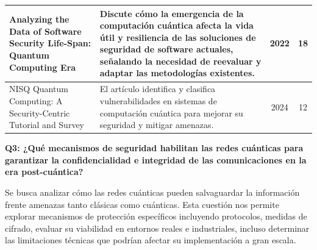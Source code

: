 \begin{longtable}{@{} p{4.5cm} p{6.5cm} c c @{}}
\hline
Analyzing the Data of Software Security Life-Span: Quantum Computing Era~\cite{Alyami2022} & Discute cómo la emergencia de la computación cuántica afecta la vida útil y resiliencia de las soluciones de seguridad de software actuales, señalando la necesidad de reevaluar y adaptar las metodologías existentes. & 2022 & 18 \\
\hline
NISQ Quantum Computing: A Security-Centric Tutorial and Survey~\cite{Chen2024} & El artículo identifica y clasifica vulnerabilidades en sistemas de computación cuántica para mejorar su seguridad y mitigar amenazas. & 2024 & 12 \\
\end{longtable}

\vspace{1em} \textbf {Q3: ¿Qué mecanismos de seguridad habilitan las redes cuánticas para garantizar la confidencialidad e integridad de las comunicaciones en la era post-cuántica?}

Se busca analizar cómo las redes cuánticas pueden salvaguardar la información frente amenazas tanto clásicas como cuánticas. Esta cuestión nos permite explorar mecanismos de protección específicos incluyendo protocolos, medidas de cifrado, evaluar su viabilidad en entornos reales e industriales, incluso determinar las limitaciones técnicas que podrían afectar su implementación a gran escala.


